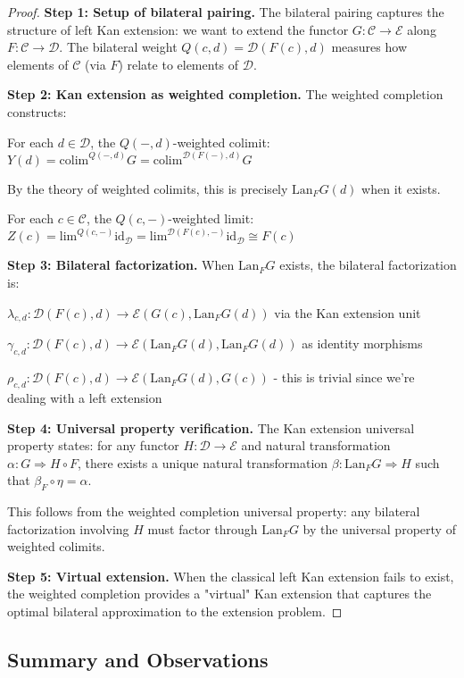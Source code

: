 \documentclass[11pt]{article}
\theoremstyle{plain}
\theoremstyle{definition}
\theoremstyle{remark}
\newcommand{\C}{\mathcal{C}}
\newcommand{\D}{\mathcal{D}}
\newcommand{\E}{\mathcal{E}}
\newcommand{\colim}{\mathrm{colim}}
\renewcommand{\lim}{\mathrm{lim}}
\begin{document}
\begin{proof}
\textbf{Step 1: Setup of bilateral pairing.}
The bilateral pairing captures the structure of left Kan extension: we want to extend the functor $G : \C \to \E$ along $F : \C \to \D$. The bilateral weight $Q(c, d) = \D(F(c), d)$ measures how elements of $\C$ (via $F$) relate to elements of $\D$.

\textbf{Step 2: Kan extension as weighted completion.}
The weighted completion constructs:

For each $d \in \D$, the $Q(-, d)$-weighted colimit:
$Y(d) = \colim^{Q(-, d)} G = \colim^{\D(F(-), d)} G$

By the theory of weighted colimits, this is precisely $\text{Lan}_F G(d)$ when it exists.

For each $c \in \C$, the $Q(c, -)$-weighted limit:
$Z(c) = \lim^{Q(c, -)} \text{id}_\D = \lim^{\D(F(c), -)} \text{id}_\D \cong F(c)$

\textbf{Step 3: Bilateral factorization.}
When $\text{Lan}_F G$ exists, the bilateral factorization is:

$\lambda_{c,d} : \D(F(c), d) \to \E(G(c), \text{Lan}_F G(d))$ via the Kan extension unit

$\gamma_{c,d} : \D(F(c), d) \to \E(\text{Lan}_F G(d), \text{Lan}_F G(d))$ as identity morphisms

$\rho_{c,d} : \D(F(c), d) \to \E(\text{Lan}_F G(d), G(c))$ - this is trivial since we're dealing with a left extension

\textbf{Step 4: Universal property verification.}
The Kan extension universal property states: for any functor $H : \D \to \E$ and natural transformation $\alpha : G \Rightarrow H \circ F$, there exists a unique natural transformation $\beta : \text{Lan}_F G \Rightarrow H$ such that $\beta_F \circ \eta = \alpha$.

This follows from the weighted completion universal property: any bilateral factorization involving $H$ must factor through $\text{Lan}_F G$ by the universal property of weighted colimits.

\textbf{Step 5: Virtual extension.}
When the classical left Kan extension fails to exist, the weighted completion provides a "virtual" Kan extension that captures the optimal bilateral approximation to the extension problem.
\end{proof}

\subsection{Summary and Observations}
\end{document}
